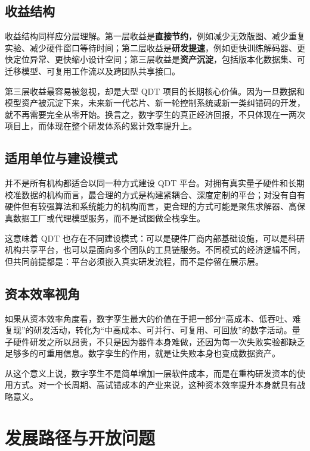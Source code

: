 \documentclass[11pt,a4paper]{article}
\newcommand{\QDT}{QDT}
\begin{document}
\subsection{收益结构}

收益结构同样应分层理解。第一层收益是\textbf{直接节约}，例如减少无效版图、减少重复实验、减少硬件窗口等待时间；第二层收益是\textbf{研发提速}，例如更快训练解码器、更快定位异常、更快缩小设计空间；第三层收益是\textbf{资产沉淀}，包括版本化数据集、可迁移模型、可复用工作流以及跨团队共享接口。

第三层收益最容易被忽视，却是大型 \QDT{} 项目的长期核心价值。因为一旦数据和模型资产被沉淀下来，未来新一代芯片、新一轮控制系统或新一类纠错码的开发，就不再需要完全从零开始。换言之，数字孪生的真正经济回报，不只体现在一两次项目上，而体现在整个研发体系的累计效率提升上。

\subsection{适用单位与建设模式}

并不是所有机构都适合以同一种方式建设 \QDT{} 平台。对拥有真实量子硬件和长期校准数据的机构而言，最合理的方式是构建紧耦合、深度定制的平台；对没有自有硬件但有较强算法和系统能力的机构而言，更合理的方式可能是聚焦求解器、高保真数据工厂或代理模型服务，而不是试图做全栈孪生。

这意味着 \QDT{} 也存在不同建设模式：可以是硬件厂商内部基础设施，可以是科研机构共享平台，也可以是面向多个团队的工具链服务。不同模式的经济逻辑不同，但共同前提都是：平台必须嵌入真实研发流程，而不是停留在展示层。

\subsection{资本效率视角}

如果从资本效率角度看，数字孪生最大的价值在于把一部分“高成本、低吞吐、难复现”的研发活动，转化为“中高成本、可并行、可复用、可回放”的数字活动。量子硬件研发之所以昂贵，不只是因为器件本身难做，还因为每一次失败实验都缺乏足够多的可重用信息。数字孪生的作用，就是让失败本身也变成数据资产。

从这个意义上说，数字孪生不是简单增加一层软件成本，而是在重构研发资本的使用方式。对一个长周期、高试错成本的产业来说，这种资本效率提升本身就具有战略意义。

\section{发展路径与开放问题}
\end{document}
